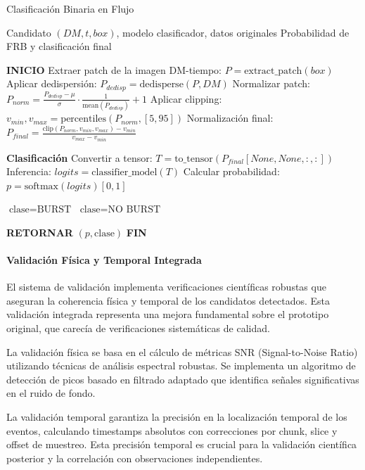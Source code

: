 \begin{algorithm}[H]
\caption{Clasificación Binaria en Flujo}
\label{alg:binary-classification}
\begin{algorithmic}[1]
\Require Candidato $(DM, t, box)$, modelo clasificador, datos originales
\Ensure Probabilidad de FRB y clasificación final

\State \textbf{INICIO}
\State Extraer patch de la imagen DM-tiempo: $P = \text{extract\_patch}(box)$
\State Aplicar dedispersión: $P_{dedisp} = \text{dedisperse}(P, DM)$
\State Normalizar patch: $P_{norm} = \frac{P_{dedisp} - \mu}{\sigma} \cdot \frac{1}{\text{mean}(P_{dedisp})} + 1$
\State Aplicar clipping: $v_{min}, v_{max} = \text{percentiles}(P_{norm}, [5, 95])$
\State Normalización final: $P_{final} = \frac{\text{clip}(P_{norm}, v_{min}, v_{max}) - v_{min}}{v_{max} - v_{min}}$

\State \textbf{Clasificación}
\State Convertir a tensor: $T = \text{to\_tensor}(P_{final}[None, None, :, :])$
\State Inferencia: $logits = \text{classifier\_model}(T)$
\State Calcular probabilidad: $p = \text{softmax}(logits)[0, 1]$

    \State $\text{clase} = \text{BURST}$
\Else
    \State $\text{clase} = \text{NO BURST}$
\EndIf

\State \textbf{RETORNAR} $(p, \text{clase})$
\State \textbf{FIN}
\end{algorithmic}
\end{algorithm}
\paragraph{Validación Física y Temporal Integrada}

El sistema de validación implementa verificaciones científicas robustas que aseguran la coherencia física y temporal de los candidatos detectados. Esta validación integrada representa una mejora fundamental sobre el prototipo original, que carecía de verificaciones sistemáticas de calidad.

La validación física se basa en el cálculo de métricas SNR (Signal-to-Noise Ratio) utilizando técnicas de análisis espectral robustas. Se implementa un algoritmo de detección de picos basado en filtrado adaptado que identifica señales significativas en el ruido de fondo.

La validación temporal garantiza la precisión en la localización temporal de los eventos, calculando timestamps absolutos con correcciones por chunk, slice y offset de muestreo. Esta precisión temporal es crucial para la validación científica posterior y la correlación con observaciones independientes.

